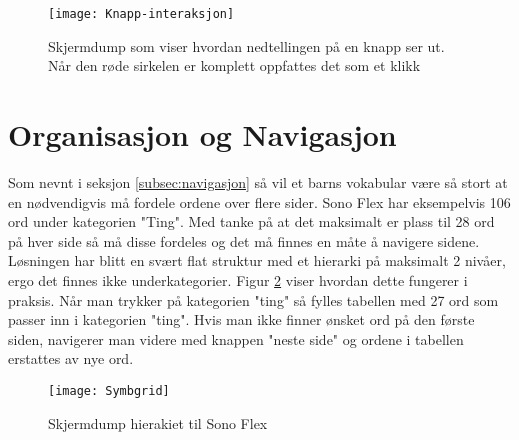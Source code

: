 \begin{figure}[ht!]
\centering
\texttt{[image: Knapp-interaksjon]}
\caption{Skjermdump som viser hvordan nedtellingen på en knapp ser ut. Når den røde sirkelen er komplett oppfattes det som et klikk}
\label{fig:knapp-interaksjon}
\end{figure}


\section{Organisasjon og Navigasjon}

Som nevnt i seksjon \ref{subsec:navigasjon} så vil et barns vokabular være så stort at en nødvendigvis må fordele ordene over flere sider. Sono Flex har eksempelvis 106 ord under kategorien "Ting". Med tanke på at det maksimalt er plass til 28 ord på hver side så må disse fordeles og det må finnes en måte å navigere sidene. Løsningen har blitt en svært flat struktur med et hierarki på maksimalt 2 nivåer, ergo det finnes ikke underkategorier. Figur \ref{fig:hieraki-ting} viser hvordan dette fungerer i praksis. Når man trykker på kategorien "ting" så fylles tabellen med 27 ord som passer inn i kategorien "ting". Hvis man ikke finner ønsket ord på den første siden, navigerer man videre med knappen "neste side" og ordene i tabellen erstattes av nye ord. 


\begin{figure}[ht!]
\centering
\texttt{[image: Symbgrid]}
\caption{Skjermdump hierakiet til Sono Flex}
\label{fig:hieraki-ting}
\end{figure}
